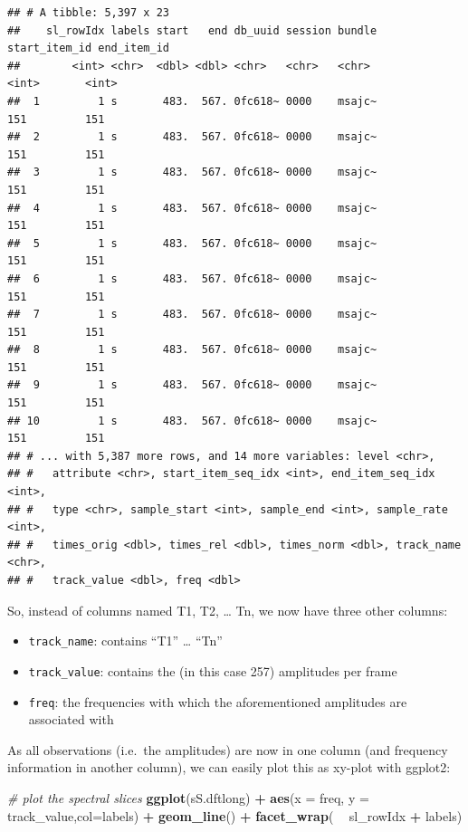 \documentclass[]{book}
\newenvironment{Shaded}{\begin{snugshade}}{\end{snugshade}}
\newcommand{\CommentTok}[1]{\textcolor[rgb]{0.56,0.35,0.01}{\textit{#1}}}
\newcommand{\DataTypeTok}[1]{\textcolor[rgb]{0.13,0.29,0.53}{#1}}
\newcommand{\KeywordTok}[1]{\textcolor[rgb]{0.13,0.29,0.53}{\textbf{#1}}}
\newcommand{\NormalTok}[1]{#1}
\newcommand{\OperatorTok}[1]{\textcolor[rgb]{0.81,0.36,0.00}{\textbf{#1}}}
\newcommand{\StringTok}[1]{\textcolor[rgb]{0.31,0.60,0.02}{#1}}
\providecommand{\tightlist}{%
  \setlength{\itemsep}{0pt}\setlength{\parskip}{0pt}}
\begin{document}
\begin{verbatim}
## # A tibble: 5,397 x 23
##    sl_rowIdx labels start   end db_uuid session bundle start_item_id end_item_id
##        <int> <chr>  <dbl> <dbl> <chr>   <chr>   <chr>          <int>       <int>
##  1         1 s       483.  567. 0fc618~ 0000    msajc~           151         151
##  2         1 s       483.  567. 0fc618~ 0000    msajc~           151         151
##  3         1 s       483.  567. 0fc618~ 0000    msajc~           151         151
##  4         1 s       483.  567. 0fc618~ 0000    msajc~           151         151
##  5         1 s       483.  567. 0fc618~ 0000    msajc~           151         151
##  6         1 s       483.  567. 0fc618~ 0000    msajc~           151         151
##  7         1 s       483.  567. 0fc618~ 0000    msajc~           151         151
##  8         1 s       483.  567. 0fc618~ 0000    msajc~           151         151
##  9         1 s       483.  567. 0fc618~ 0000    msajc~           151         151
## 10         1 s       483.  567. 0fc618~ 0000    msajc~           151         151
## # ... with 5,387 more rows, and 14 more variables: level <chr>,
## #   attribute <chr>, start_item_seq_idx <int>, end_item_seq_idx <int>,
## #   type <chr>, sample_start <int>, sample_end <int>, sample_rate <int>,
## #   times_orig <dbl>, times_rel <dbl>, times_norm <dbl>, track_name <chr>,
## #   track_value <dbl>, freq <dbl>
\end{verbatim}

So, instead of columns named T1, T2, \ldots{} Tn, we now have three other columns:

\begin{itemize}
\tightlist
\item
  \texttt{track\_name}: contains ``T1'' \ldots{} ``Tn''
\item
  \texttt{track\_value}: contains the (in this case 257) amplitudes per frame
\item
  \texttt{freq}: the frequencies with which the aforementioned amplitudes are associated with
\end{itemize}

As all observations (i.e.~the amplitudes) are now in one column (and frequency information in another column), we can easily plot this as xy-plot with ggplot2:

\begin{Shaded}
\begin{Highlighting}[]
\CommentTok{# plot the spectral slices}
\KeywordTok{ggplot}\NormalTok{(sS.dftlong) }\OperatorTok{+}
\StringTok{  }\KeywordTok{aes}\NormalTok{(}\DataTypeTok{x =}\NormalTok{ freq, }\DataTypeTok{y =}\NormalTok{ track_value,}\DataTypeTok{col=}\NormalTok{labels) }\OperatorTok{+}
\StringTok{  }\KeywordTok{geom_line}\NormalTok{() }\OperatorTok{+}
\StringTok{  }\KeywordTok{facet_wrap}\NormalTok{( }\OperatorTok{~}\StringTok{ }\NormalTok{sl_rowIdx }\OperatorTok{+}\StringTok{ }\NormalTok{labels)}
\end{Highlighting}
\end{Shaded}
\end{document}
